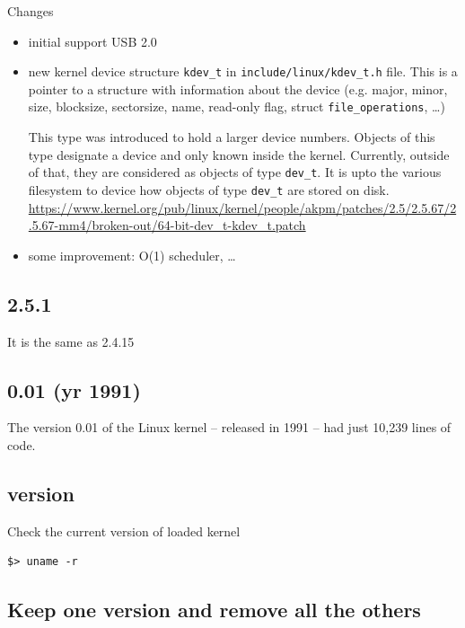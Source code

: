 Changes
\begin{itemize}
  \item initial support USB 2.0
  
  \item new kernel device structure \verb!kdev_t! in
  \verb!include/linux/kdev_t.h! file. This is a pointer to a structure with
  information about the device (e.g. major, minor, size, blocksize, sectorsize,
  name, read-only flag, struct \verb!file_operations!, \ldots)
  
  This type was introduced to hold a larger device numbers. Objects of this type
  designate a device and only known inside the kernel. Currently, outside of that,
  they are considered as objects of type \verb!dev_t!. It is upto the various filesystem
  to device how objects of type \verb!dev_t! are stored on disk.
  \url{https://www.kernel.org/pub/linux/kernel/people/akpm/patches/2.5/2.5.67/2.5.67-mm4/broken-out/64-bit-dev_t-kdev_t.patch}
  
  \item some improvement: O(1) scheduler, \ldots
\end{itemize}

\subsection{2.5.1}

It is the same as 2.4.15

\subsection{0.01 (yr 1991)}

The version 0.01 of the Linux kernel -- released in 1991 -- had just 10,239
lines of code.

\subsection{version}
\label{sec:Linux_kernel_version}

Check the current version of loaded kernel
\begin{verbatim}
$> uname -r
\end{verbatim}

\subsection{Keep one version and remove all the others}
\label{sec:Linux_kernel_keep-one-remove-others}

